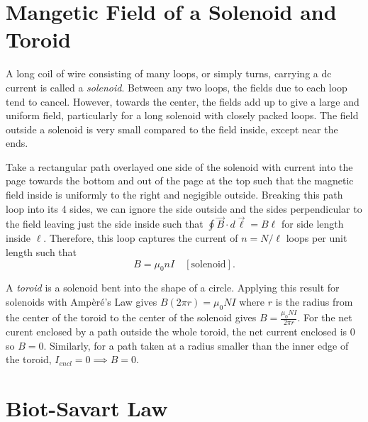 \section{Mangetic Field of a Solenoid and Toroid}

\begin{definition}[Solenoid]
    A long coil of wire consisting of many loops, or simply turns, carrying a dc current is called a \emph{solenoid}. Between any two loops, the fields due to each loop tend to cancel. However, towards the center, the fields add up to give a large and uniform field, particularly for a long solenoid with closely packed loops. The field outside a solenoid is very small compared to the field inside, except near the ends. 
\end{definition}
\begin{remark}
    Take a rectangular path overlayed one side of the solenoid with current into the page towards the bottom and out of the page at the top such that the magnetic field inside is uniformly to the right and negigible outside. Breaking this path loop into its 4 sides, we can ignore the side outside and the sides perpendicular to the field leaving just the side inside such that $\oint\vec{B}\cdot d\vec{\ell} = B\ell$ for side length inside $\ell$. Therefore, this loop captures the current of $n = N/\ell$ loops per unit length such that $$B = \mu_0nI \quad [\text{solenoid}].$$
\end{remark}
\begin{definition}[Toroid]
    A \emph{toroid} is a solenoid bent into the shape of a circle. Applying this result for solenoids with Ampèré's Law gives $B(2\pi r) = \mu_0NI$ where $r$ is the radius from the center of the toroid to the center of the solenoid gives $B = \frac{\mu_0NI}{2\pi r}.$ For the net curent enclosed by a path outside the whole toroid, the net current enclosed is 0 so $B = 0$. Similarly, for a path taken at a radius smaller than the inner edge of the toroid, $I_{encl} = 0 \implies B = 0.$ 
\end{definition}

\section{Biot-Savart Law}

